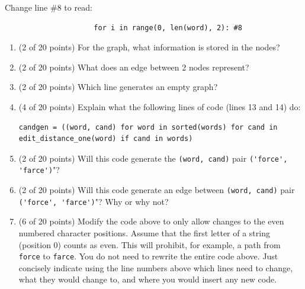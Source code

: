 \documentclass[10pt]{article}
\begin{document}
\begin{enumerate}
\begin{enumerate}
			Change line \#8 to read:
							\begin{lstlisting}
            		 for i in range(0, len(word), 2): #8
				\end{lstlisting}
				\bigskip
                \end{enumerate}
		\else
		\begin{enumerate}
			\item (2 of 20 points) For the graph, what information is stored in the nodes?
				\bigskip
				\bigskip
				\bigskip
				\bigskip
				\bigskip
				\bigskip
				\bigskip
				\bigskip
				\bigskip
				\bigskip

			\item (2 of 20 points) What does an edge between 2 nodes represent?
				\bigskip
				\bigskip
				\bigskip
				\bigskip
				\bigskip
				\bigskip
				\bigskip
				\bigskip
				\bigskip
				\bigskip

			\item (2 of 20 points) Which line generates an empty graph?
				\bigskip
				\bigskip
				\bigskip
				\bigskip
				\bigskip
				\bigskip
				\bigskip
				\bigskip
				\bigskip
				\bigskip
	

			\item (4 of 20 points) Explain what the following lines of code (lines 13 and 14) do:
\begin{lstlisting}
candgen = ((word, cand) for word in sorted(words) for cand in edit_distance_one(word) if cand in words)
\end{lstlisting}
				\bigskip
				\bigskip
				\bigskip
				\bigskip
				\bigskip
				\bigskip
				\bigskip
				\bigskip
				\bigskip
				\bigskip
		
		\item (2 of 20 points) Will this code generate the \verb|(word, cand)| pair \verb|('force', 'farce')|"?
				\bigskip
				\bigskip
				\bigskip
				\bigskip
				\bigskip
				\bigskip
				\bigskip
				\bigskip
				\bigskip
				\bigskip

		\item (2 of 20 points) Will this code generate an edge between \verb|(word, cand)| pair \verb|('force', 'farce')|"? Why or why not?
				\bigskip
				\bigskip
				\bigskip
				\bigskip
				\bigskip
				\bigskip
				\bigskip
				\bigskip
				\bigskip
				\bigskip

		\item (6 of 20 points) Modify the code above to only allow changes to the even numbered character positions. Assume that the first letter of a string (position 0) counts as even. This will prohibit, for example, a path from \verb*|force| to \verb*|farce|. You do not need to rewrite the entire code above. Just concisely indicate using the line numbers above which lines need to change, what they would change to,  and where you would insert any new code.
				\bigskip
				\bigskip
				\bigskip
				\bigskip
				\bigskip
				\bigskip
				\bigskip
				\bigskip
				\bigskip
				\bigskip
                \end{enumerate}
		\fi


\end{enumerate}
\end{document}
